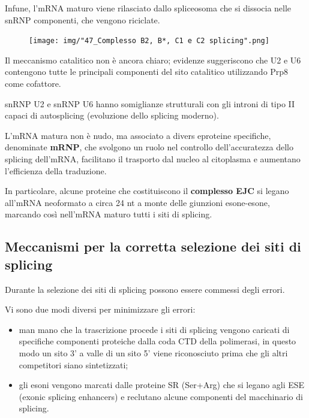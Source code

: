 \documentclass[11pt]{book}
\begin{document}
Infune, l'mRNA maturo viene rilasciato dallo spliceosoma che si dissocia
nelle snRNP componenti, che vengono riciclate.

\begin{figure}[htp]
\centering
\texttt{[image: img/"47\_Complesso B2, B*, C1 e C2 splicing".png]}
\caption{}
\label{complesso-b2-b-c1-e-c2-splicing}
\end{figure}

Il meccanismo catalitico non è ancora chiaro; evidenze suggeriscono che
U2 e U6 contengono tutte le principali componenti del sito catalitico
utilizzando Prp8 come cofattore.

snRNP U2 e snRNP U6 hanno somiglianze strutturali con gli introni di
tipo II capaci di autosplicing (evoluzione dello splicing moderno).

L'mRNA matura non è nudo, ma associato a divers eproteine specifiche,
denominate \textbf{mRNP}, che svolgono un ruolo nel controllo
dell'accuratezza dello splicing dell'mRNA, facilitano il trasporto dal
nucleo al citoplasma e aumentano l'efficienza della traduzione.

In particolare, alcune proteine che costituiscono il \textbf{complesso
EJC} si legano all'mRNA neoformato a circa 24 nt a monte delle giunzioni
esone-esone, marcando così nell'mRNA maturo tutti i siti di splicing.

\subsection{Meccanismi per la corretta selezione dei siti di
splicing}\label{meccanismi-per-la-corretta-selezione-dei-siti-di-splicing}

Durante la selezione dei siti di splicing possono essere commessi degli
errori.

Vi sono due modi diversi per minimizzare gli errori:

\begin{itemize}
\itemsep1pt\parskip0pt
\item
  man mano che la trascrizione procede i siti di splicing vengono
  caricati di specifiche componenti proteiche dalla coda CTD della
  polimerasi, in questo modo un sito 3' a valle di un sito 5' viene
  riconosciuto prima che gli altri competitori siano sintetizzati;
\item
  gli esoni vengono marcati dalle proteine SR (Ser+Arg) che si legano
  agli ESE (exonic splicing enhancers) e reclutano alcune componenti del
  macchinario di splicing.
\end{itemize}
\end{document}
